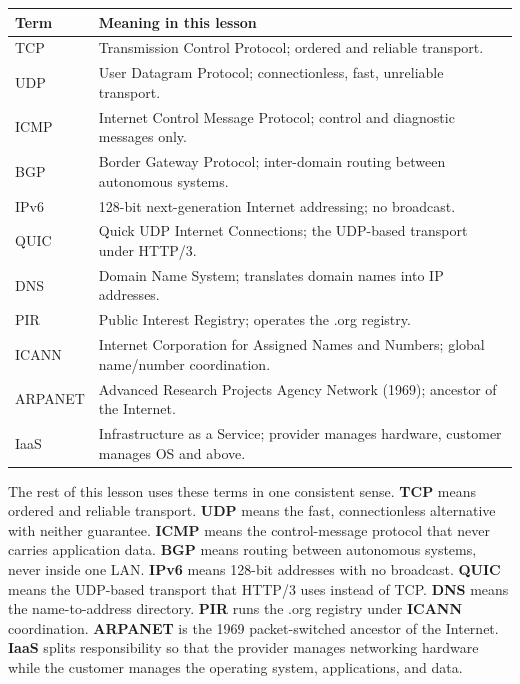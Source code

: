 \documentclass[11pt]{article}
\begin{document}
\begin{center}
\begin{tabular}{p{}p{}}
\toprule
\textbf{Term} & \textbf{Meaning in this lesson} \\
\midrule
TCP & Transmission Control Protocol; ordered and reliable transport. \\
UDP & User Datagram Protocol; connectionless, fast, unreliable transport. \\
ICMP & Internet Control Message Protocol; control and diagnostic messages only. \\
BGP & Border Gateway Protocol; inter-domain routing between autonomous systems. \\
IPv6 & 128-bit next-generation Internet addressing; no broadcast. \\
QUIC & Quick UDP Internet Connections; the UDP-based transport under HTTP/3. \\
DNS & Domain Name System; translates domain names into IP addresses. \\
PIR & Public Interest Registry; operates the .org registry. \\
ICANN & Internet Corporation for Assigned Names and Numbers; global name/number coordination. \\
ARPANET & Advanced Research Projects Agency Network (1969); ancestor of the Internet. \\
IaaS & Infrastructure as a Service; provider manages hardware, customer manages OS and above. \\
\bottomrule
\end{tabular}
\end{center}

The rest of this lesson uses these terms in one consistent sense. \textbf{TCP}
means ordered and reliable transport. \textbf{UDP} means the fast,
connectionless alternative with neither guarantee. \textbf{ICMP} means the
control-message protocol that never carries application data.
\textbf{BGP} means routing between autonomous systems, never inside one LAN.
\textbf{IPv6} means 128-bit addresses with no broadcast. \textbf{QUIC} means
the UDP-based transport that HTTP/3 uses instead of TCP. \textbf{DNS} means
the name-to-address directory. \textbf{PIR} runs the .org registry under
\textbf{ICANN} coordination. \textbf{ARPANET} is the 1969 packet-switched
ancestor of the Internet. \textbf{IaaS} splits responsibility so that the
provider manages networking hardware while the customer manages the operating
system, applications, and data.
\end{document}
